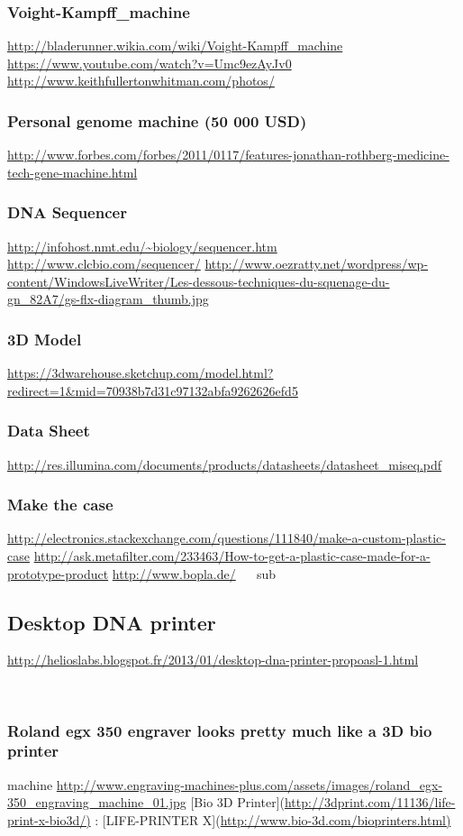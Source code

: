 \subsubsection {Voight-Kampff\_machine}
\url{http://bladerunner.wikia.com/wiki/Voight-Kampff_machine}
\url{https://www.youtube.com/watch?v=Umc9ezAyJv0}
\url{http://www.keithfullertonwhitman.com/photos/}
~
\subsubsection {Personal genome machine (50 000 USD)}
\url{http://www.forbes.com/forbes/2011/0117/features-jonathan-rothberg-medicine-tech-gene-machine.html}
~
\subsubsection {DNA Sequencer}
\url{http://infohost.nmt.edu/~biology/sequencer.htm}
\url{http://www.clcbio.com/sequencer/}
\url{http://www.oezratty.net/wordpress/wp-content/WindowsLiveWriter/Les-dessous-techniques-du-squenage-du-gn_82A7/gs-flx-diagram_thumb.jpg}
~
\subsubsection {3D Model}

\url{https://3dwarehouse.sketchup.com/model.html?redirect=1&mid=70938b7d31c97132abfa9262626efd5}
\subsubsection {Data Sheet}
\url{http://res.illumina.com/documents/products/datasheets/datasheet_miseq.pdf}
~
\subsubsection {Make the case}
\url{http://electronics.stackexchange.com/questions/111840/make-a-custom-plastic-case}
\url{http://ask.metafilter.com/233463/How-to-get-a-plastic-case-made-for-a-prototype-product}
\url{http://www.bopla.de/}
~
~sub\subsection {Desktop DNA printer}
\url{http://helioslabs.blogspot.fr/2013/01/desktop-dna-printer-propoasl-1.html}

~
\subsubsection {Roland egx 350 engraver looks pretty much like a 3D bio printer}
machine
\url{http://www.engraving-machines-plus.com/assets/images/roland_egx-350_engraving_machine_01.jpg}
[Bio 3D Printer](\url{http://3dprint.com/11136/life-print-x-bio3d/)} :
[LIFE-PRINTER X](\url{http://www.bio-3d.com/bioprinters.html)}
~
